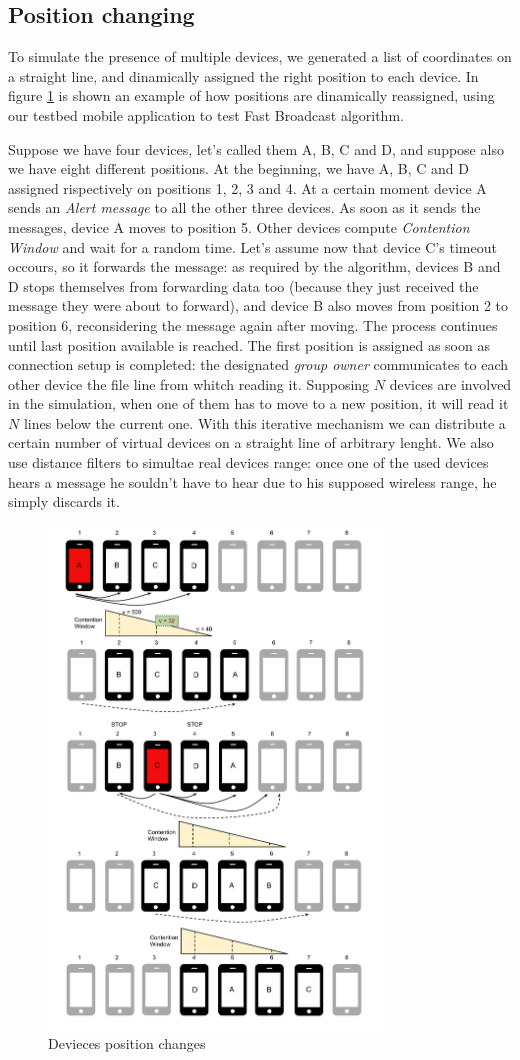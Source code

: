 \subsection{Position changing}
\label{sec:position_change}

To simulate the presence of multiple devices, we generated a list of coordinates on a straight line, and dinamically assigned the right position to each device. In figure \ref{fig:positions} is shown an example of how positions are dinamically reassigned, using our testbed mobile application to test Fast Broadcast algorithm.

Suppose we have four devices, let's called them A, B, C and D, and suppose also we have eight different positions. At the beginning, we have A, B, C and D assigned rispectively on positions 1, 2, 3 and 4. At a certain moment device A sends an \emph{Alert message} to all the other three devices. As soon as it sends the messages, device A moves to position 5. Other devices compute \textit{Contention Window} and wait for a random time. Let's assume now that device C's timeout occours, so it forwards the message: as required by the algorithm, devices B and D stops themselves from forwarding data too (because they just received the message they were about to forward), and device B also moves from position 2 to position 6, reconsidering the message again after moving. The process continues until last position available is reached.
The first position is assigned as soon as connection setup is completed: the designated \textit{group owner} communicates to each other device the file line from whitch reading it. Supposing $N$ devices are involved in the simulation, when one of them has to move to a new position, it will read it $N$ lines below the current one.
With this iterative mechanism we can distribute a certain number of virtual devices on a straight line of arbitrary lenght. 
We also use distance filters to simultae real devices range: once one of the used devices hears a message he souldn't have to hear due to his supposed wireless range, he simply discards it.

\begin{figure}[htbp]
\centering
\includegraphics[trim = 10mm 15mm 10mm 10mm ,width=3.5in]{imgs/Positions_1.pdf}
\caption{Devieces position changes}
\label{fig:positions}
\end{figure}
